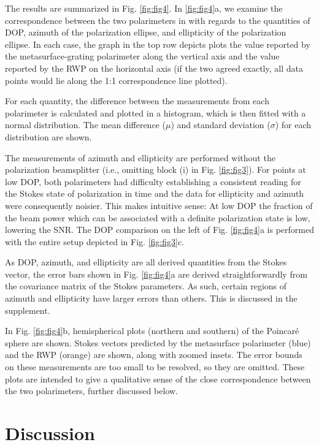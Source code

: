 \documentclass[footinbib,aps,prl,twocolumn,superscriptaddress]{revtex4-1}
\begin{document}
The results are summarized in Fig. \ref{fig:fig4}. In \ref{fig:fig4}a, we examine the correspondence between the two polarimeters in with regards to the quantities of DOP, azimuth of the polarization ellipse, and ellipticity of the polarization ellipse. In each case, the graph in the top row depicts plots the value reported by the metasurface-grating polarimeter along the vertical axis and the value reported by the RWP on the horizontal axis (if the two agreed exactly, all data points would lie along the 1:1 correspondence line plotted).

For each quantity, the difference between the measurements from each polarimeter is calculated and plotted in a histogram, which is then fitted with a normal distribution. The mean difference ($\mu$) and standard deviation ($\sigma$) for each distribution are shown.

The measurements of azimuth and ellipticity are performed without the polarization beamsplitter (i.e., omitting block (i) in Fig. \ref{fig:fig3}). For points at low DOP, both polarimeters had difficulty establishing a consistent reading for the Stokes state of polarization in time and the data for ellipticity and azimuth were consequently noisier. This makes intuitive sense: At low DOP the fraction of the beam power which can be associated with a definite polarization state is low, lowering the SNR. The DOP comparison on the left of Fig. \ref{fig:fig4}a is performed with the entire setup depicted in Fig. \ref{fig:fig3}c.

As DOP, azimuth, and ellipticity are all derived quantities from the Stokes vector, the error bars shown in Fig. \ref{fig:fig4}a are derived straightforwardly from the covariance matrix of the Stokes parameters. As such, certain regions of azimuth and ellipticity have larger errors than others. This is discussed in the supplement.

In Fig. \ref{fig:fig4}b, hemispherical plots (northern and southern) of the Poincar\'e sphere are shown. Stokes vectors predicted by the metasurface polarimeter (blue) and the RWP (orange) are shown, along with zoomed insets. The error bounds on these measurements are too small to be resolved, so they are omitted. These plots are intended to give a qualitative sense of the close correspondence between the two polarimeters, further discussed below.

\section{Discussion}
\end{document}

